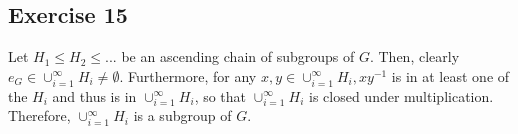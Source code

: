 \subsection*{Exercise 15}
Let $H_1 \le H_2 \le ...$ be an ascending chain of subgroups of $G$. Then, clearly $e_G \in \cup_{i=1}^\infty H_i \not= \emptyset$. Furthermore, for any $x,y \in \cup_{i=1}^\infty H_i, xy^{-1}$ is in at least one of the $H_i$ and thus is in $\cup_{i=1}^\infty H_i$, so that $\cup_{i=1}^\infty H_i$ is closed under multiplication. Therefore, $\cup_{i=1}^\infty H_i$ is a subgroup of $G$.